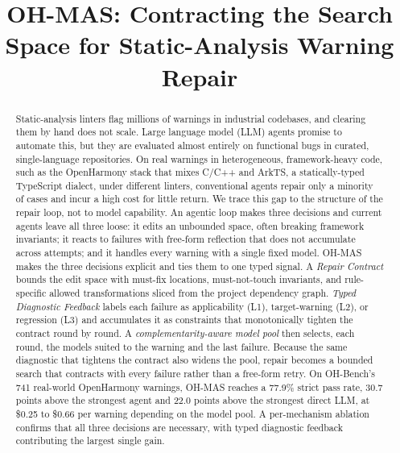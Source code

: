 \documentclass[10pt,conference]{IEEEtran}
\begin{document}
\title{OH-MAS: Contracting the Search Space for Static-Analysis Warning Repair}

\author{
}

\maketitle

\begin{abstract}
Static-analysis linters flag millions of warnings in industrial codebases, and clearing them by hand does not scale. Large language model (LLM) agents promise to automate this, but they are evaluated almost entirely on functional bugs in curated, single-language repositories. On real warnings in heterogeneous, framework-heavy code, such as the OpenHarmony stack that mixes C/C++ and ArkTS, a statically-typed TypeScript dialect, under different linters, conventional agents repair only a minority of cases and incur a high cost for little return. We trace this gap to the structure of the repair loop, not to model capability. An agentic loop makes three decisions and current agents leave all three loose: it edits an unbounded space, often breaking framework invariants; it reacts to failures with free-form reflection that does not accumulate across attempts; and it handles every warning with a single fixed model. OH-MAS makes the three decisions explicit and ties them to one typed signal. A \emph{Repair Contract} bounds the edit space with must-fix locations, must-not-touch invariants, and rule-specific allowed transformations sliced from the project dependency graph. \emph{Typed Diagnostic Feedback} labels each failure as applicability (L1), target-warning (L2), or regression (L3) and accumulates it as constraints that monotonically tighten the contract round by round. A \emph{complementarity-aware model pool} then selects, each round, the models suited to the warning and the last failure. Because the same diagnostic that tightens the contract also widens the pool, repair becomes a bounded search that contracts with every failure rather than a free-form retry. On OH-Bench's 741 real-world OpenHarmony warnings, OH-MAS reaches a 77.9\% strict pass rate, 30.7 points above the strongest agent and 22.0 points above the strongest direct LLM, at \$0.25 to \$0.66 per warning depending on the model pool. A per-mechanism ablation confirms that all three decisions are necessary, with typed diagnostic feedback contributing the largest single gain.
\end{abstract}
\end{document}
